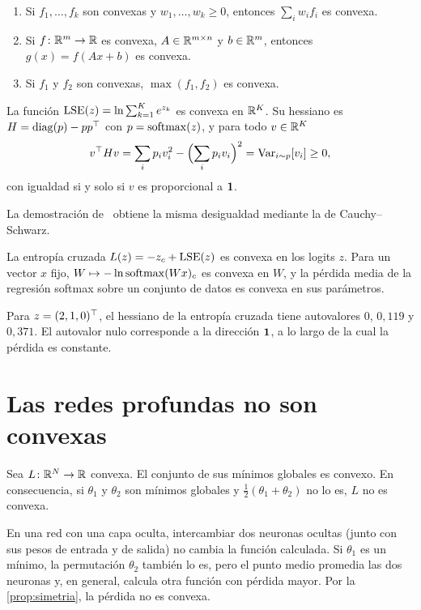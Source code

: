 \begin{proposicion}\label{prop:operaciones}
\begin{enumerate}
  \item Si $f_1,\dots,f_k$ son convexas y $w_1,\dots,w_k\ge 0$, entonces $\sum_i w_if_i$ es convexa.
  \item Si $f\colon\mathbb{R}^{m}\to\mathbb{R}$ es convexa, $A\in\mathbb{R}^{m\times n}$ y $b\in\mathbb{R}^{m}$, entonces $g(x)=f(Ax+b)$ es convexa.
  \item Si $f_1$ y $f_2$ son convexas, $\max(f_1,f_2)$ es convexa.
\end{enumerate}
\end{proposicion}

\begin{proposicion}\label{prop:lse-convexa}
La función $\operatorname{LSE}(z)=\ln\sum_{k=1}^{K}e^{z_k}$ es convexa en $\mathbb{R}^{K}$. Su hessiano es $H=\operatorname{diag}(p)-pp^{\top}$ con $p=\operatorname{softmax}(z)$, y para todo $v\in\mathbb{R}^{K}$
\[
v^{\top} Hv=\sum_i p_iv_i^{2}-\Bigl(\sum_i p_iv_i\Bigr)^{2}=\operatorname{Var}_{i\sim p}[v_i]\ge 0,
\]
con igualdad si y solo si $v$ es proporcional a $\mathbf{1}$.
\end{proposicion}

La demostración de~\cite[§3.1]{bv} obtiene la misma desigualdad mediante la de Cauchy--Schwarz.

\begin{corolario}\label{cor:ce-convexa}
La entropía cruzada $L(z)=-z_c+\operatorname{LSE}(z)$ es convexa en los logits $z$. Para un vector $x$ fijo, $W\mapsto -\ln\operatorname{softmax}(Wx)_c$ es convexa en $W$, y la pérdida media de la regresión softmax sobre un conjunto de datos es convexa en sus parámetros.
\end{corolario}

Para $z=(2,1,0)^{\top}$, el hessiano de la entropía cruzada tiene autovalores $0$, $0{,}119$ y $0{,}371$. El autovalor nulo corresponde a la dirección $\mathbf{1}$, a lo largo de la cual la pérdida es constante.

\section{Las redes profundas no son convexas}

\begin{proposicion}\label{prop:simetria}
Sea $L\colon\mathbb{R}^{N}\to\mathbb{R}$ convexa. El conjunto de sus mínimos globales es convexo. En consecuencia, si $\theta_1$ y $\theta_2$ son mínimos globales y $\tfrac12(\theta_1+\theta_2)$ no lo es, $L$ no es convexa.
\end{proposicion}

En una red con una capa oculta, intercambiar dos neuronas ocultas (junto con sus pesos de entrada y de salida) no cambia la función calculada. Si $\theta_1$ es un mínimo, la permutación $\theta_2$ también lo es, pero el punto medio promedia las dos neuronas y, en general, calcula otra función con pérdida mayor. Por la \cref{prop:simetria}, la pérdida no es convexa.

\addtocounter{definicion}{1}%

\addtocounter{figure}{1}%

\addtocounter{definicion}{1}%

